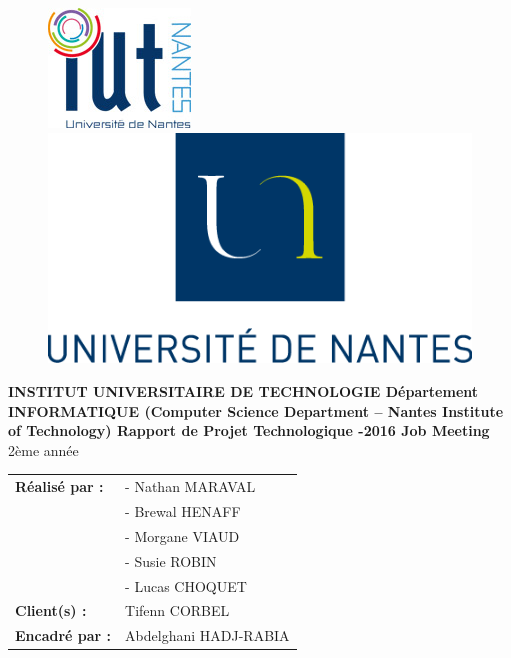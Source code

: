 \documentclass[12pt,a4paper]{article}
\begin{document}
\thispagestyle{empty}

\begin{figure}
\begin{minipage}[t]{5cm}
\centering
\includegraphics[scale=0.75]{iutNantes.jpg}
\end{minipage}
\begin{minipage}[t]{15cm}
\centering
\includegraphics[scale=1.3]{logo_UnivNantes.png}
\end{minipage}
\end{figure}

\bigbreak
\bigbreak
\bigbreak
\bigbreak

\begin{center}
\begin{large}
\textbf{INSTITUT UNIVERSITAIRE DE TECHNOLOGIE \bigbreak
Département INFORMATIQUE \bigbreak
(Computer Science Department – Nantes Institute of Technology)
\bigbreak
\bigbreak
\bigbreak
Rapport de Projet Technologique -2016
\bigbreak
\bigbreak
Job Meeting}
\bigbreak
2ème année
\end{large}
\end{center}

\bigbreak
\bigbreak
\bigbreak

\begin{tabular}{C{8cm}L{5cm}}
\textbf{Réalisé par :} & - Nathan MARAVAL \\
 & - Brewal HENAFF\\
 & - Morgane VIAUD\\
 & - Susie ROBIN\\
 & - Lucas CHOQUET\\
\textbf{Client(s) :} & Tifenn CORBEL\\
\textbf{Encadré par :} & Abdelghani HADJ-RABIA
\end{tabular}
\end{document}
